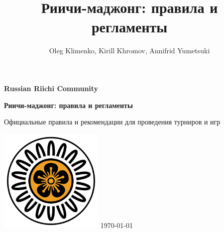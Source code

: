 \documentclass[16pt, a4paper]{article}
\author{Oleg Klimenko, Kirill Khromov, Annifrid Yumetsuki}
\title{Риичи-маджонг: правила и регламенты}
\begin{document}
	\setlength\parindent{15pt}
	\pagestyle{empty}
	\begin{center}
		\LARGE
		{\bfseries Russian Riichi Community\par}
		\vspace{4cm}
		{\huge\bfseries Риичи-маджонг: правила и регламенты\par}
		\vspace{3cm}
		\par
		
		\normalsize
		Официальные правила и рекомендации для проведения турниров и игр\par
		\vspace{5cm}
		\includegraphics[width=5cm]{logo}
		\vfill
		\today
	\end{center}
	\newpage
	
	\tableofcontents
	\newpage
	
	\pagestyle{plain}
	
	
	
	\newpage
	
	\newpage
	
	\newpage
	
	\newpage
	
	\newpage
	
	\newpage
	
	
\end{document}
